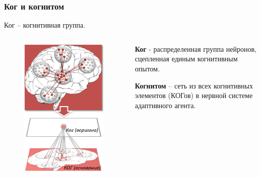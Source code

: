 \documentclass[default]{beamer}
\begin{document}
	\begin{frame}
		\frametitle{Ког и когнитом}
		
		Ког – когнитивная группа.
		
		\begin{columns}
			\begin{column}{0.3\textwidth}
				\begin{figure}
					\includegraphics[width=\textwidth]{cog}
				\end{figure}
			\end{column}
			\begin{column}{0.7\textwidth}
				\textbf{Ког} - распределенная группа нейронов, сцепленная единым когнитивным опытом.  
				\par\bigskip
				\textbf{Когнитом}  –  сеть из всех когнитивных элементов (КОГов)  в нервной системе адаптивного агента.
			\end{column}
		\end{columns}
	\end{frame}
\end{document}
